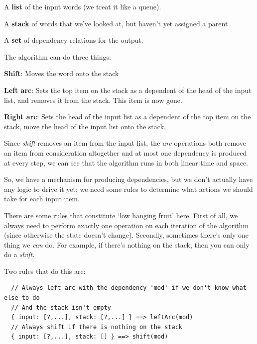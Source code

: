 \begin{description}
  \item A \textbf{list} of the input words (we treat it like a queue).
  \item A \textbf{stack} of words that we've looked at, but haven't yet assigned
    a parent
  \item A \textbf{set} of dependency relations for the output.
\end{description}

The algorithm can do three things:

\begin{description}
  \item \textbf{Shift}: Moves the word onto the stack
  \item \textbf{Left arc}: Sets the top item on the stack as a dependent of the
    head of the input list, and removes it from the stack. This item is now
    gone.
  \item \textbf{Right arc}: Sets the head of the input list as a dependent of
    the top item on the stack, move the head of the input list onto the stack.
\end{description}

Since \textit{shift} removes an item from the input list, the \textit{arc}
operations both remove an item from consideration altogether and at most one
dependency is produced at every step, we can see that the algorithm runs in both
linear time and space.

So, we have a mechanism for producing dependencies, but we don't actually have
any logic to drive it yet; we need some rules to determine what actions we
should take for each input item.

There are some rules that constitute `low hanging fruit' here. First of all, we
always need to perform exactly one operation on each iteration of the algorithm
(since otherwise the state doesn't change). Secondly, sometimes there's only one
thing we \textit{can} do. For example, if there's nothing on the stack, then you
can only do a \textit{shift}.

Two rules that do this are:

\begin{verbatim}
  // Always left arc with the dependency 'mod' if we don't know what else to do
  // And the stack isn't empty
  { input: [?,...], stack: [?,...] } ==> leftArc(mod)
  // Always shift if there is nothing on the stack
  { input: [?,...], stack: [] } ==> shift(mod)
\end{verbatim}

